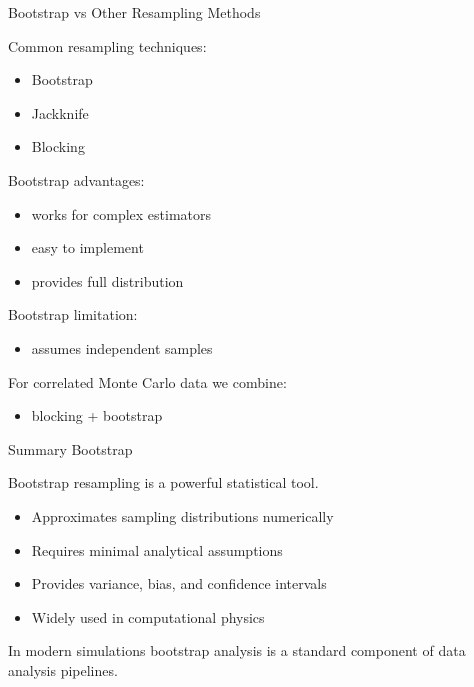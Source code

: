 \documentclass{beamer}
\begin{document}

\begin{frame}{Bootstrap vs Other Resampling Methods}

Common resampling techniques:

\begin{itemize}

\item Bootstrap
\item Jackknife
\item Blocking
\end{itemize}

Bootstrap advantages:

\begin{itemize}

\item works for complex estimators
\item easy to implement
\item provides full distribution
\end{itemize}

Bootstrap limitation:

\begin{itemize}

\item assumes independent samples
\end{itemize}

For correlated Monte Carlo data we combine:

\begin{itemize}

\item blocking + bootstrap
\end{itemize}
\end{frame}


\begin{frame}{Summary Bootstrap}

Bootstrap resampling is a powerful statistical tool.

\begin{itemize}

\item Approximates sampling distributions numerically
\item Requires minimal analytical assumptions
\item Provides variance, bias, and confidence intervals
\item Widely used in computational physics

\end{itemize}

In modern simulations bootstrap analysis is a standard component of data analysis pipelines.
\end{frame}
\end{document}
